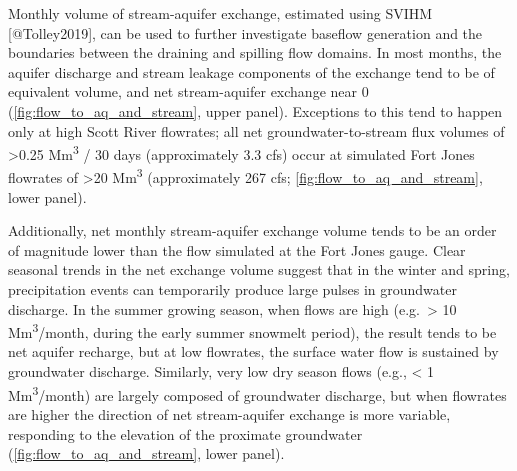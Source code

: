 \documentclass[
]{article}
\begin{document}
Monthly volume of stream-aquifer exchange, estimated using SVIHM
{[}@Tolley2019{]}, can be used to further investigate baseflow
generation and the boundaries between the draining and spilling flow
domains. In most months, the aquifer discharge and stream leakage
components of the exchange tend to be of equivalent volume, and net
stream-aquifer exchange near 0 (\autoref{fig:flow_to_aq_and_stream},
upper panel). Exceptions to this tend to happen only at high Scott River
flowrates; all net groundwater-to-stream flux volumes of
\textgreater0.25 Mm\textsuperscript{3} / 30 days (approximately 3.3 cfs)
occur at simulated Fort Jones flowrates of \textgreater20
Mm\textsuperscript{3} (approximately 267 cfs;
\autoref{fig:flow_to_aq_and_stream}, lower panel).

Additionally, net monthly stream-aquifer exchange volume tends to be an
order of magnitude lower than the flow simulated at the Fort Jones
gauge. Clear seasonal trends in the net exchange volume suggest that in
the winter and spring, precipitation events can temporarily produce
large pulses in groundwater discharge. In the summer growing season,
when flows are high (e.g.~\textgreater{} 10 Mm\textsuperscript{3}/month,
during the early summer snowmelt period), the result tends to be net
aquifer recharge, but at low flowrates, the surface water flow is
sustained by groundwater discharge. Similarly, very low dry season flows
(e.g., \textless{} 1 Mm\textsuperscript{3}/month) are largely composed
of groundwater discharge, but when flowrates are higher the direction of
net stream-aquifer exchange is more variable, responding to the
elevation of the proximate groundwater
(\autoref{fig:flow_to_aq_and_stream}, lower panel).
\end{document}
